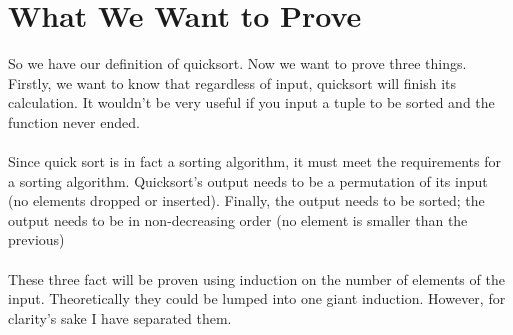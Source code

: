 \documentclass{article}
\begin{document}
\section{What We Want to Prove}
So we have our definition of quicksort. Now we want to prove three things. Firstly, we want to know that regardless of input, quicksort will finish its calculation. It wouldn't be very useful if you input a tuple to be sorted and the function never ended.
\\\\
Since quick sort is in fact a sorting algorithm, it must meet the requirements for a sorting algorithm. Quicksort's output needs to be a permutation of its input (no elements dropped or inserted). Finally, the output needs to be sorted; the output needs to be in non-decreasing order (no element is smaller than the previous)
\\\\
These three fact will be proven using induction on the number of elements of the input. Theoretically they could be lumped into one giant induction. However, for clarity's sake I have separated them.
\end{document}
